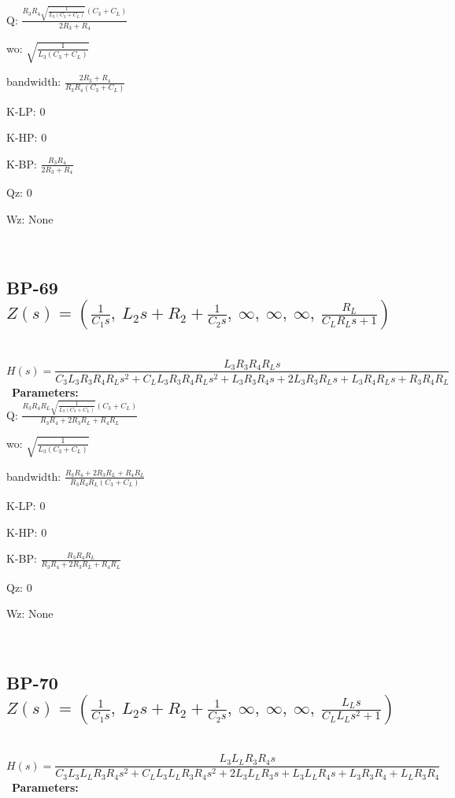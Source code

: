 \documentclass{article}
\begin{document}
Q: $\frac{R_{3} R_{4} \sqrt{\frac{1}{L_{3} \left(C_{3} + C_{L}\right)}} \left(C_{3} + C_{L}\right)}{2 R_{3} + R_{4}}$\ 

wo: $\sqrt{\frac{1}{L_{3} \left(C_{3} + C_{L}\right)}}$\ 

bandwidth: $\frac{2 R_{3} + R_{4}}{R_{3} R_{4} \left(C_{3} + C_{L}\right)}$\ 

K-LP: $0$\ 

K-HP: $0$\ 

K-BP: $\frac{R_{3} R_{4}}{2 R_{3} + R_{4}}$\ 

Qz: $0$\ 

Wz: $\text{None}$\ 

\ 

\subsection{BP-69 $Z(s) = \left( \frac{1}{C_{1} s}, \  L_{2} s + R_{2} + \frac{1}{C_{2} s}, \  \infty, \  \infty, \  \infty, \  \frac{R_{L}}{C_{L} R_{L} s + 1}\right)$ } \ 
\textbf{\[H(s) = \frac{L_{3} R_{3} R_{4} R_{L} s}{C_{3} L_{3} R_{3} R_{4} R_{L} s^{2} + C_{L} L_{3} R_{3} R_{4} R_{L} s^{2} + L_{3} R_{3} R_{4} s + 2 L_{3} R_{3} R_{L} s + L_{3} R_{4} R_{L} s + R_{3} R_{4} R_{L}}\] } \ 
\textbf{Parameters:}\\ 

Q: $\frac{R_{3} R_{4} R_{L} \sqrt{\frac{1}{L_{3} \left(C_{3} + C_{L}\right)}} \left(C_{3} + C_{L}\right)}{R_{3} R_{4} + 2 R_{3} R_{L} + R_{4} R_{L}}$\ 

wo: $\sqrt{\frac{1}{L_{3} \left(C_{3} + C_{L}\right)}}$\ 

bandwidth: $\frac{R_{3} R_{4} + 2 R_{3} R_{L} + R_{4} R_{L}}{R_{3} R_{4} R_{L} \left(C_{3} + C_{L}\right)}$\ 

K-LP: $0$\ 

K-HP: $0$\ 

K-BP: $\frac{R_{3} R_{4} R_{L}}{R_{3} R_{4} + 2 R_{3} R_{L} + R_{4} R_{L}}$\ 

Qz: $0$\ 

Wz: $\text{None}$\ 

\ 

\subsection{BP-70 $Z(s) = \left( \frac{1}{C_{1} s}, \  L_{2} s + R_{2} + \frac{1}{C_{2} s}, \  \infty, \  \infty, \  \infty, \  \frac{L_{L} s}{C_{L} L_{L} s^{2} + 1}\right)$ } \ 
\textbf{\[H(s) = \frac{L_{3} L_{L} R_{3} R_{4} s}{C_{3} L_{3} L_{L} R_{3} R_{4} s^{2} + C_{L} L_{3} L_{L} R_{3} R_{4} s^{2} + 2 L_{3} L_{L} R_{3} s + L_{3} L_{L} R_{4} s + L_{3} R_{3} R_{4} + L_{L} R_{3} R_{4}}\] } \ 
\textbf{Parameters:}\\ 
\end{document}
